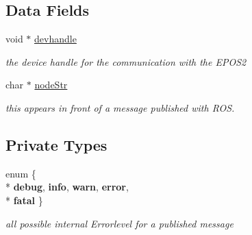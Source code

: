 \subsection*{Data Fields}
\begin{DoxyCompactItemize}
\item 
\hypertarget{classEpos2MotorController_a40594faab444bcba221ab9d55d1162cd}{void $\ast$ \hyperlink{classEpos2MotorController_a40594faab444bcba221ab9d55d1162cd}{devhandle}}\label{classEpos2MotorController_a40594faab444bcba221ab9d55d1162cd}

\begin{DoxyCompactList}\small\item\em the device handle for the communication with the E\-P\-O\-S2 \end{DoxyCompactList}\item 
char $\ast$ \hyperlink{classEpos2MotorController_aec7abbd4cd8e70e98f28cae457275e31}{node\-Str}
\begin{DoxyCompactList}\small\item\em this appears in front of a message published with R\-O\-S. \end{DoxyCompactList}\end{DoxyCompactItemize}
\subsection*{Private Types}
\begin{DoxyCompactItemize}
\item 
enum \{ \\*
{\bfseries debug}, 
{\bfseries info}, 
{\bfseries warn}, 
{\bfseries error}, 
\\*
{\bfseries fatal}
 \}
\begin{DoxyCompactList}\small\item\em all possible internal Errorlevel for a published message \end{DoxyCompactList}\end{DoxyCompactItemize}
